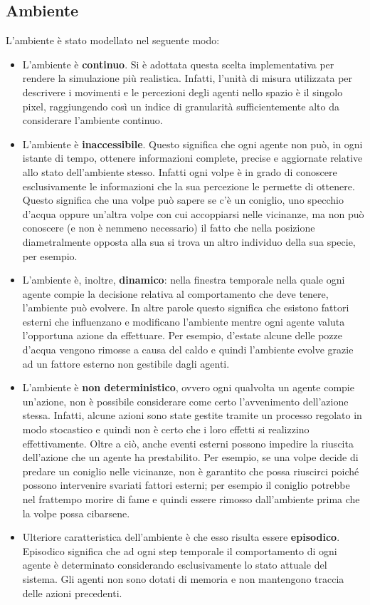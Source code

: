 \documentclass[11pt]{article}
\begin{document}
\subsection{Ambiente}
L'ambiente è stato modellato nel seguente modo:
\begin{itemize}
    \item L'ambiente è \textbf{continuo}. Si è adottata questa scelta implementativa per rendere la simulazione più realistica. Infatti, l'unità di misura utilizzata per descrivere i movimenti e le percezioni degli agenti nello spazio è il singolo pixel, raggiungendo così un indice di granularità sufficientemente alto da considerare l'ambiente continuo.
    \item L'ambiente è \textbf{inaccessibile}. Questo significa che ogni agente non può, in ogni istante di tempo, ottenere informazioni complete, precise e aggiornate relative allo stato dell'ambiente stesso. Infatti ogni volpe è in grado di conoscere esclusivamente le informazioni che la sua percezione le permette di ottenere. Questo significa che una volpe può sapere se c'è un coniglio, uno specchio d'acqua oppure un'altra volpe con cui accoppiarsi nelle vicinanze, ma non può conoscere (e non è nemmeno necessario) il fatto che nella posizione diametralmente opposta alla sua si trova un altro individuo della sua specie, per esempio.
    \item L'ambiente è, inoltre, \textbf{dinamico}: nella finestra temporale nella quale ogni agente compie la decisione relativa al comportamento che deve tenere, l'ambiente può evolvere. In altre parole questo significa che esistono fattori esterni che influenzano e modificano l'ambiente mentre ogni agente valuta l'opportuna azione da effettuare. Per esempio, d'estate alcune delle pozze d'acqua vengono rimosse a causa del caldo e quindi l'ambiente evolve grazie ad un fattore esterno non gestibile dagli agenti.
    \item L'ambiente è \textbf{non deterministico}, ovvero ogni qualvolta un agente compie un'azione, non è possibile considerare come certo l'avvenimento dell'azione stessa. Infatti, alcune azioni sono state gestite tramite un processo regolato in modo stocastico e quindi non è certo che i loro effetti si realizzino effettivamente. Oltre a ciò, anche eventi esterni possono impedire la riuscita dell'azione che un agente ha prestabilito. Per esempio, se una volpe decide di predare un coniglio nelle vicinanze, non è garantito che possa riuscirci poiché possono intervenire svariati fattori esterni; per esempio il coniglio potrebbe nel frattempo morire di fame e quindi essere rimosso dall'ambiente prima che la volpe possa cibarsene. 
    \item Ulteriore caratteristica dell'ambiente è che esso risulta essere \textbf{episodico}. Episodico significa che ad ogni step temporale il comportamento di ogni agente è determinato considerando esclusivamente lo stato attuale del sistema. Gli agenti non sono dotati di memoria e non  mantengono traccia delle azioni precedenti. 
\end{itemize}
\end{document}
